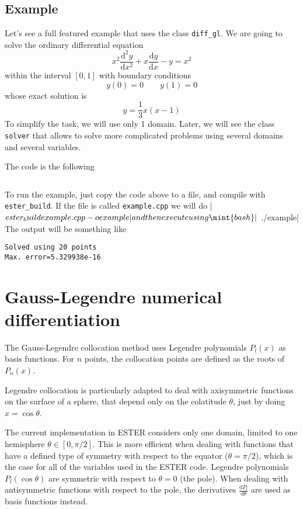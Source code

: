 \subsection{Example}

Let's see a full featured example that uses the class \texttt{diff\_gl}.
We are going to solve the ordinary differential equation
$$x^2\frac{\mathrm{d}^2y}{\mathrm{d}x^2}+x\frac{\mathrm{d}y}{\mathrm{d}x}-y=x^2$$
within the interval $[0,1]$ with boundary conditions
$$y(0)=0 \qquad y(1)=0$$
whose exact solution is
$$y=\frac{1}{3}x(x-1)$$
To simplify the task, we will use only 1 domain. Later, we will see the class \texttt{solver} that
allows to solve more complicated problems using several domains and several variables.

The code is the following

\inputminted[frame=single]{cpp}{../code_examples/numdiff/example1.cpp}

To run the example, just copy the code above to a file, and compile with \texttt{ester\_build}. 
If the file is called \texttt{example.cpp} we will do
|$ ester_build example.cpp -o example|     %
and then execute using
\mint{bash}|$ ./example|     %
The output will be something like
\begin{verbatim}
Solved using 20 points
Max. error=5.329938e-16
\end{verbatim}


\section{Gauss-Legendre numerical differentiation}

The Gauss-Legendre collocation method uses Legendre polynomials $P_l(x)$ as basis functions.
For $n$ points, the collocation points are defined as the roots of $P_n(x)$.

Legendre collocation is particularly adapted to deal with axisymmetric functions on the surface
of a sphere, that depend only on the colatitude $\theta$, just by doing $x=\cos\theta$.

The current implementation in ESTER considers only one domain, limited to one hemisphere $\theta\in[0,\pi/2]$.
This is more efficient when dealing with functions that have a defined type of symmetry 
with respect to the equator ($\theta=\pi/2$),
 which is the case for all of the variables used in the ESTER code. 
Legendre polynomials $P_l(\cos\theta)$ are symmetric with respect to $\theta=0$ (the pole). When
dealing with antisymmetric functions with respect to the pole, the derivatives 
$\frac{\mathrm{d}P_l}{\mathrm{d}\theta}$ are used as basis functions instead.

